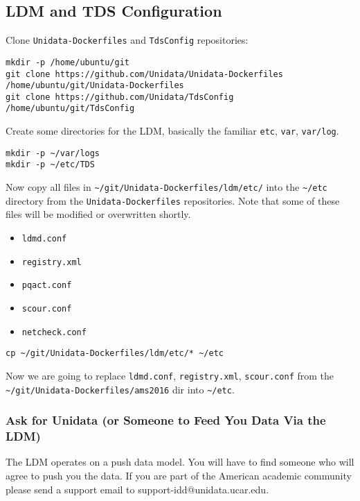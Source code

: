 \documentclass[11pt]{article}
\begin{document}
\subsection*{LDM and TDS Configuration}
\label{sec:orgheadline9}

Clone \texttt{Unidata-Dockerfiles} and \texttt{TdsConfig} repositories:

\begin{verbatim}
mkdir -p /home/ubuntu/git
git clone https://github.com/Unidata/Unidata-Dockerfiles /home/ubuntu/git/Unidata-Dockerfiles
git clone https://github.com/Unidata/TdsConfig /home/ubuntu/git/TdsConfig
\end{verbatim}

Create some directories for the LDM, basically the familiar \texttt{etc}, \texttt{var}, \texttt{var/log}.

\begin{verbatim}
mkdir -p ~/var/logs 
mkdir -p ~/etc/TDS
\end{verbatim}

Now copy all files in \texttt{\textasciitilde{}/git/Unidata-Dockerfiles/ldm/etc/} into the \texttt{\textasciitilde{}/etc} directory from the \texttt{Unidata-Dockerfiles} repositories. Note that some of these files will be modified or overwritten shortly.

\begin{itemize}
\item \texttt{ldmd.conf}
\item \texttt{registry.xml}
\item \texttt{pqact.conf}
\item \texttt{scour.conf}
\item \texttt{netcheck.conf}
\end{itemize}

\begin{verbatim}
cp ~/git/Unidata-Dockerfiles/ldm/etc/* ~/etc
\end{verbatim}

Now we are going to replace \texttt{ldmd.conf}, \texttt{registry.xml}, \texttt{scour.conf} from the \texttt{\textasciitilde{}/git/Unidata-Dockerfiles/ams2016} dir into \texttt{\textasciitilde{}/etc}.

\subsubsection*{Ask for Unidata (or Someone to Feed You Data Via the LDM)}
\label{sec:orgheadline3}

The LDM operates on a push data model. You will have to find someone who will agree to push you the data. If you are part of the American academic community please send a support email to support-idd@unidata.ucar.edu.
\end{document}
